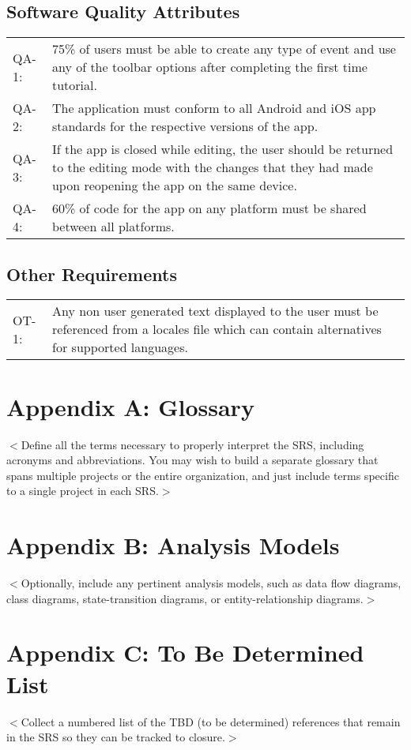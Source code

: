 \documentclass{scrreprt}
\begin{document}
\section{Software Quality Attributes}
\begin{center}
\begin{tabular}{ p{1.5cm} p{13cm} }
QA-1: & 75\% of users must be able to create any type of event and use any of the
toolbar options after completing the first time tutorial.\\
QA-2: & The application must conform to all Android and iOS app standards for the
respective versions of the app.\\
QA-3: & If the app is closed while editing, the user should be returned to the editing
mode with the changes that they had made upon reopening the app on the same device.\\
QA-4: & 60\% of code for the app on any platform must be shared between all platforms.
\end{tabular}
\end{center}

\section{Other Requirements}
\begin{center}
\begin{tabular}{ p{1.5cm} p{13cm} }
OT-1: & Any non user generated text displayed to the user must be referenced from
a locales file which can contain alternatives for supported languages.\\
\end{tabular}
\end{center}

\chapter{Appendix A: Glossary}
$<$Define all the terms necessary to properly interpret the SRS, including
acronyms and abbreviations. You may wish to build a separate glossary that spans
multiple projects or the entire organization, and just include terms specific to
a single project in each SRS.$>$

\chapter{Appendix B: Analysis Models}
$<$Optionally, include any pertinent analysis models, such as data flow
diagrams, class diagrams, state-transition diagrams, or entity-relationship
diagrams.$>$

\chapter{Appendix C: To Be Determined List}
$<$Collect a numbered list of the TBD (to be determined) references that remain
in the SRS so they can be tracked to closure.$>$
\end{document}
